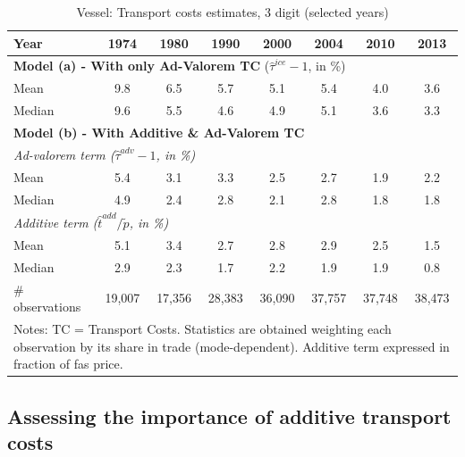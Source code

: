 \documentclass[a4paper,11pt]{article}
\begin{document}
\begin{table}[htbp]
  \centering
  \caption{Vessel: Transport costs estimates, 3 digit (selected years)}
\begin{center}
    \begin{tabular}{l|ccccccc}
   \hline\hline
Year         & 1974  & 1980  & 1990  & 2000  & 2004 & 2010  & 2013   \\
 \hline
   \multicolumn{8}{l}{\textbf{Model (a) - With only Ad-Valorem TC} ($\widehat{\tau}^{ice}-1$, in \%)}  \\
   \hline
Mean  & 9.8 & 6.5 & 5.7 & 5.1 & 5.4 & 4.0 & 3.6  \\
Median & 9.6 & 5.5 & 4.6 & 4.9 & 5.1  & 3.6 & 3.3  \\
\hline
\multicolumn{8}{l}{\textbf{Model (b) - With Additive \& Ad-Valorem TC}}    \\
\hline
\multicolumn{8}{l}{\textit{Ad-valorem term ($\widehat{\tau}^{adv}-1$, in \%)} } \\
\hline
Mean  & 5.4 & 3.1 & 3.3 & 2.5 & 2.7 & 1.9 & 2.2 \\
Median & 4.9 & 2.4 & 2.8 & 2.1 & 2.8 & 1.8 & 1.8  \\
\hline
\multicolumn{8}{l}{\textit{Additive term ($\widehat{t}^{add}/\widetilde{p}$, in \%)}}  \\
\hline
Mean  & 5.1 & 3.4 & 2.7 & 2.8 & 2.9 & 2.5 & 1.5  \\
Median & 2.9 & 2.3 & 1.7 & 2.2 & 1.9 & 1.9 & 0.8 \\
\hline
 \# observations & 19,007 & 17,356 & 28,383 & 36,090 & 37,757 & 37,748 & 38,473 \\
\hline\hline
\multicolumn{8}{l}{\parbox[l]{11cm}{ \vspace{7pt}\scriptsize{Notes: TC = Transport Costs.
Statistics are obtained weighting each observation by its share in trade (mode-dependent).
Additive term expressed in fraction of fas price.}}}
\end{tabular}%
\end{center} \label{tab:result_ves_3d_detail}
\end{table}%


\subsection{Assessing the importance of additive transport costs \label{app:diagnostic_test}}
\end{document}
